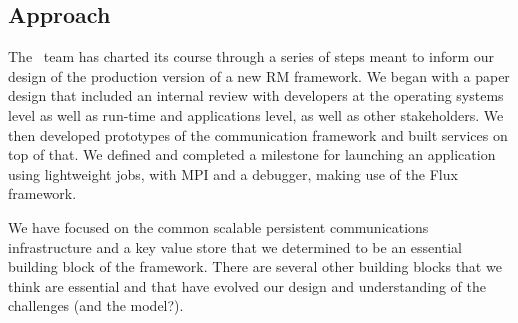\subsection{Approach}

The \flux\ team has charted its course through a series of steps
meant to inform our design of the production version of a new
RM framework.  We began with a paper design that included an
internal review with developers at the operating systems level
as well as run-time and applications level, as well as other
stakeholders.  We then developed prototypes of the communication
framework and built services on top of that. We defined and completed
a milestone for launching an application using lightweight jobs,
with MPI and a debugger, making use of the Flux framework.

We have focused on the common scalable persistent communications
infrastructure and a key value store that we determined to be
an essential building block of the framework.
There are several other building blocks that we think are essential
and that have evolved our design and understanding of the challenges
(and the model?).

\ifcomments
{}
\fi
